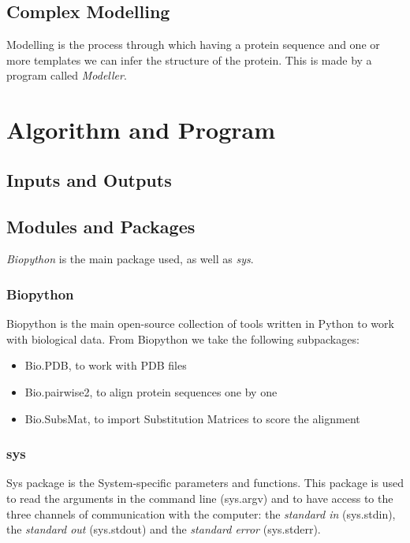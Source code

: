 \documentclass[a4paper,12pt]{report}
\begin{document}
\section{Complex Modelling}

Modelling is the process through which having a protein sequence and one or more templates we can infer the structure of the protein. This is made by a program called \textit{Modeller}. 



\chapter{Algorithm and Program}


\section{Inputs and Outputs}

\section{Modules and Packages}

\textit{Biopython} is the main package used, as well as \textit{sys}. 

\subsection{Biopython}

Biopython is the main open-source collection of tools written in Python to work with biological data. From Biopython we take the following subpackages:

\begin{itemize}
 \item Bio.PDB, to work with PDB files
 \item Bio.pairwise2, to align protein sequences one by one
 \item Bio.SubsMat, to import Substitution Matrices to score the alignment
\end{itemize}

\subsection{sys}

Sys package is the System-specific parameters and functions. This package is used to read the arguments in the command line (sys.argv) and to have access to the three channels of communication with the computer: the \textit{standard in} (sys.stdin), the \textit{standard out} (sys.stdout) and the \textit{standard error} (sys.stderr).
\end{document}
